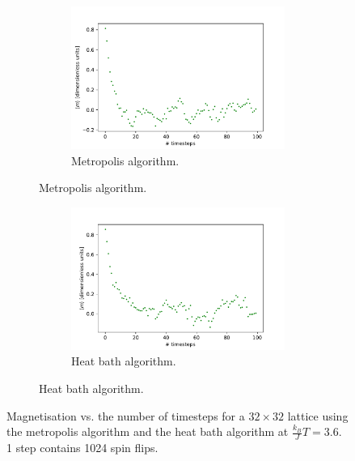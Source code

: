 \documentclass[10 pt, a4paper]{article}
\begin{document}
\begin{figure}[H] 
\begin{subfigure}[b]{0.5\textwidth}
\begin{figure}[H]
\includegraphics[width=\textwidth]{timeMC}
\caption{Metropolis algorithm. \label{fig:metro}}
\end{figure}
\end{subfigure}
\begin{subfigure}[b]{0.5\textwidth}
\begin{figure}[H] 
\includegraphics[width=\textwidth]{timeHeatbath}
\caption{Heat bath algorithm. \label{fig:heat}}
\end{figure}
\end{subfigure}
\caption{Magnetisation vs. the number of timesteps for a $32 \times 32$ lattice using the metropolis algorithm and the heat bath algorithm  at $\frac{k_B}{J} T = 3.6$. 1 step contains 1024 spin flips.} 
\end{figure}
\end{document}
